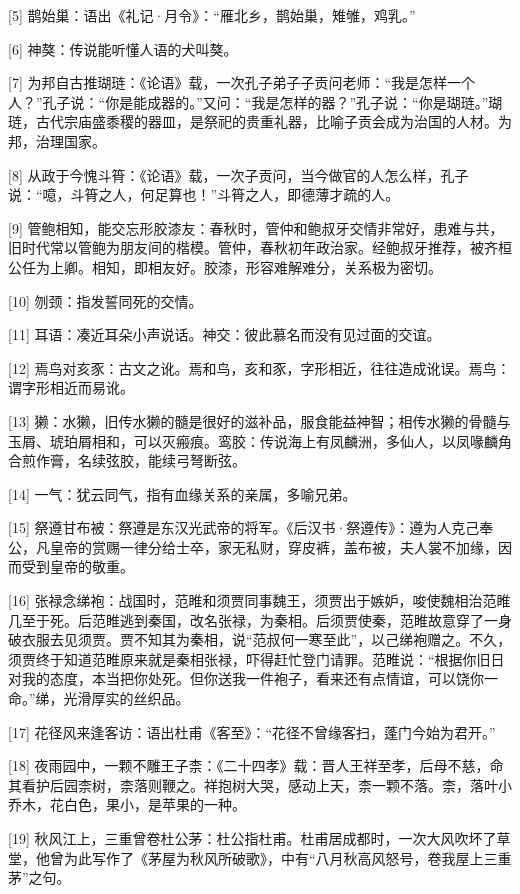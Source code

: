 \documentclass[12pt,UTF8]{ctexbook}
\begin{document}
[5] 鹊始巢：语出《礼记·月令》：“雁北乡，鹊始巢，雉雊，鸡乳。”

[6] 神獒：传说能听懂人语的犬叫獒。

[7] 为邦自古推瑚琏：《论语》载，一次孔子弟子子贡问老师：“我是怎样一个人？”孔子说：“你是能成器的。”又问：“我是怎样的器？”孔子说：“你是瑚琏。”瑚琏，古代宗庙盛黍稷的器皿，是祭祀的贵重礼器，比喻子贡会成为治国的人材。为邦，治理国家。

[8] 从政于今愧斗筲：《论语》载，一次子贡问，当今做官的人怎么样，孔子说：“噫，斗筲之人，何足算也！”斗筲之人，即德薄才疏的人。

[9] 管鲍相知，能交忘形胶漆友：春秋时，管仲和鲍叔牙交情非常好，患难与共，旧时代常以管鲍为朋友间的楷模。管仲，春秋初年政治家。经鲍叔牙推荐，被齐桓公任为上卿。相知，即相友好。胶漆，形容难解难分，关系极为密切。

[10] 刎颈：指发誓同死的交情。

[11] 耳语：凑近耳朵小声说话。神交：彼此慕名而没有见过面的交谊。

[12] 焉鸟对亥豕：古文之讹。焉和鸟，亥和豕，字形相近，往往造成讹误。焉鸟：谓字形相近而易讹。

[13] 獭：水獭，旧传水獭的髓是很好的滋补品，服食能益神智；相传水獭的骨髓与玉屑、琥珀屑相和，可以灭瘢痕。鸾胶：传说海上有凤麟洲，多仙人，以凤喙麟角合煎作膏，名续弦胶，能续弓弩断弦。

[14] 一气：犹云同气，指有血缘关系的亲属，多喻兄弟。

[15] 祭遵甘布被：祭遵是东汉光武帝的将军。《后汉书·祭遵传》：遵为人克己奉公，凡皇帝的赏赐一律分给士卒，家无私财，穿皮裤，盖布被，夫人裳不加缘，因而受到皇帝的敬重。

[16] 张禄念绨袍：战国时，范睢和须贾同事魏王，须贾出于嫉妒，唆使魏相治范睢几至于死。后范睢逃到秦国，改名张禄，为秦相。后须贾使秦，范睢故意穿了一身破衣服去见须贾。贾不知其为秦相，说“范叔何一寒至此”，以己绨袍赠之。不久，须贾终于知道范睢原来就是秦相张禄，吓得赶忙登门请罪。范睢说：“根据你旧日对我的态度，本当把你处死。但你送我一件袍子，看来还有点情谊，可以饶你一命。”绨，光滑厚实的丝织品。

[17] 花径风来逢客访：语出杜甫《客至》：“花径不曾缘客扫，蓬门今始为君开。”

[18] 夜雨园中，一颗不雕王子柰：《二十四孝》载：晋人王祥至孝，后母不慈，命其看护后园柰树，柰落则鞭之。祥抱树大哭，感动上天，柰一颗不落。柰，落叶小乔木，花白色，果小，是苹果的一种。

[19] 秋风江上，三重曾卷杜公茅：杜公指杜甫。杜甫居成都时，一次大风吹坏了草堂，他曾为此写作了《茅屋为秋风所破歌》，中有“八月秋高风怒号，卷我屋上三重茅”之句。
\end{document}
